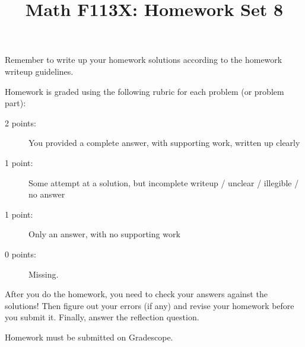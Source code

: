 \documentclass[11pt, oneside]{article}   	%
\title{Math F113X: Homework Set 8}
\date{}							%
\begin{document}
\maketitle

\vspace{-1.5cm}



\vfill

\hrulefill

Remember to write up your homework solutions according to the homework writeup guidelines. 

Homework is graded using the following rubric for each problem (or problem part):

\begin{description}
\item[2 points:] You provided a complete answer, with supporting work, written up clearly
\item[1 point:] Some attempt at a solution, but incomplete writeup / unclear / illegible / no answer
\item[1 point:] Only an answer, with no supporting work 
\item[0 points:] Missing.
\end{description}

After you do the homework, you need to check your answers against the solutions! Then figure out your errors (if any) and revise your homework before you submit it. Finally, answer the reflection question.

Homework must be submitted on Gradescope.
\end{document}
